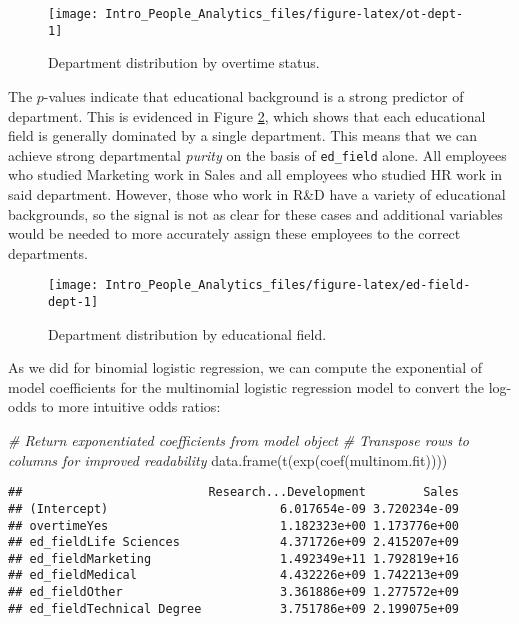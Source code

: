 \documentclass[
]{book}
\newenvironment{Shaded}{\begin{snugshade}}{\end{snugshade}}
\newcommand{\CommentTok}[1]{\textcolor[rgb]{0.56,0.35,0.01}{\textit{#1}}}
\newcommand{\FunctionTok}[1]{\textcolor[rgb]{0.00,0.00,0.00}{#1}}
\newcommand{\NormalTok}[1]{#1}
\begin{document}
\begin{figure}

{\centering \texttt{[image: Intro\_People\_Analytics\_files/figure-latex/ot-dept-1]} 

}

\caption{Department distribution by overtime status.}\label{fig:ot-dept}
\end{figure}

The \(p\)-values indicate that educational background is a strong predictor of department. This is evidenced in Figure \ref{fig:ed-field-dept}, which shows that each educational field is generally dominated by a single department. This means that we can achieve strong departmental \emph{purity} on the basis of \texttt{ed\_field} alone. All employees who studied Marketing work in Sales and all employees who studied HR work in said department. However, those who work in R\&D have a variety of educational backgrounds, so the signal is not as clear for these cases and additional variables would be needed to more accurately assign these employees to the correct departments.

\begin{figure}

{\centering \texttt{[image: Intro\_People\_Analytics\_files/figure-latex/ed-field-dept-1]} 

}

\caption{Department distribution by educational field.}\label{fig:ed-field-dept}
\end{figure}

As we did for binomial logistic regression, we can compute the exponential of model coefficients for the multinomial logistic regression model to convert the log-odds to more intuitive odds ratios:

\begin{Shaded}
\begin{Highlighting}[]
\CommentTok{\# Return exponentiated coefficients from model object}
\CommentTok{\# Transpose rows to columns for improved readability}
\FunctionTok{data.frame}\NormalTok{(}\FunctionTok{t}\NormalTok{(}\FunctionTok{exp}\NormalTok{(}\FunctionTok{coef}\NormalTok{(multinom.fit))))}
\end{Highlighting}
\end{Shaded}

\begin{verbatim}
##                          Research...Development        Sales
## (Intercept)                        6.017654e-09 3.720234e-09
## overtimeYes                        1.182323e+00 1.173776e+00
## ed_fieldLife Sciences              4.371726e+09 2.415207e+09
## ed_fieldMarketing                  1.492349e+11 1.792819e+16
## ed_fieldMedical                    4.432226e+09 1.742213e+09
## ed_fieldOther                      3.361886e+09 1.277572e+09
## ed_fieldTechnical Degree           3.751786e+09 2.199075e+09
\end{verbatim}
\end{document}

